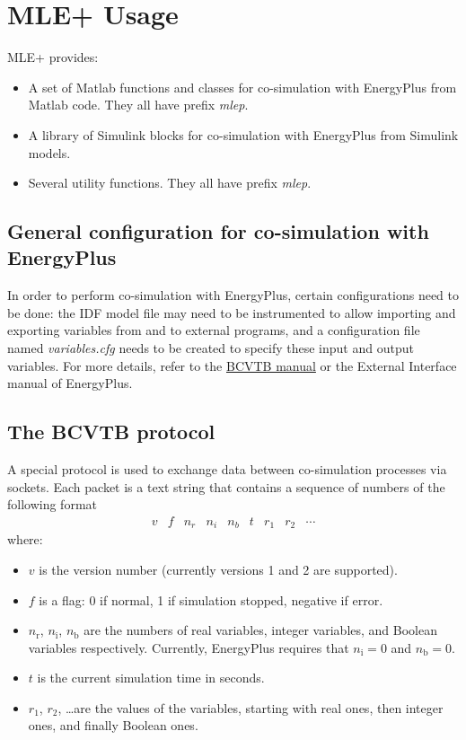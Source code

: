 \documentclass[11pt,letter]{article}
\newcommand{\MLEP}{MLE+\xspace}
\begin{document}
\section{\MLEP Usage}
\label{sec:usage}

\MLEP provides:
\begin{itemize}
\item A set of Matlab functions and classes for co-simulation with
EnergyPlus from Matlab code.  They all have prefix \emph{mlep}.
\item A library of Simulink blocks for co-simulation with EnergyPlus from
Simulink models.
\item Several utility functions.  They all have prefix \emph{mlep}.
\end{itemize}

\subsection{General configuration for co-simulation with EnergyPlus}
\label{sec-4-1}

In order to perform co-simulation with EnergyPlus, certain configurations
need to be done: the IDF model file may need to be instrumented to
allow importing and exporting variables from and to external programs,
and a configuration file named \emph{variables.cfg} needs to be created to
specify these input and output variables.  For more details, refer to
the \href{http://simulationresearch.lbl.gov/bcvtb/releases/latest/doc/manual/index.xhtml}{BCVTB manual} or the External Interface manual of EnergyPlus.

\subsection{The BCVTB protocol}
\label{sec-4-4}

A special protocol is used to exchange data between co-simulation
processes via sockets.  Each packet is a text string that contains a
sequence of numbers of the following format
\[ \begin{matrix}
  v & f & n_r & n_i & n_b & t & r_1 & r_2 & \cdots
\end{matrix} \]
where:
\begin{itemize}
\item $v$ is the version number (currently versions 1 and 2 are supported).
\item $f$ is a flag: 0 if normal, 1 if simulation stopped, negative if
error.
\item $n_{\text{r}}$, $n_{\text{i}}$, $n_{\text{b}}$ are the numbers of real variables, integer
variables, and Boolean variables respectively.  Currently, EnergyPlus requires that $n_{\text{i}}=0$ and $n_{\text{b}}=0$.
\item $t$ is the current simulation time in seconds.
\item $r_{\text{1}}$, $r_{\text{2}}$, \dots are the values of the variables, starting with real
ones, then integer ones, and finally Boolean ones.
\end{itemize}
\end{document}
